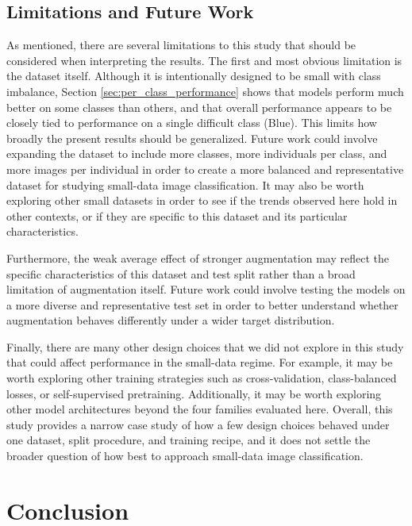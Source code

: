 \documentclass[conference]{IEEEtran}
\begin{document}
\subsection{Limitations and Future Work}

As mentioned, there are several limitations to this study that should be considered when interpreting the results. The first and most obvious limitation is the dataset itself. Although it is intentionally designed to be small with class imbalance, Section \ref{sec:per_class_performance} shows that models perform much better on some classes than others, and that overall performance appears to be closely tied to performance on a single difficult class (Blue). This limits how broadly the present results should be generalized. Future work could involve expanding the dataset to include more classes, more individuals per class, and more images per individual in order to create a more balanced and representative dataset for studying small-data image classification. It may also be worth exploring other small datasets in order to see if the trends observed here hold in other contexts, or if they are specific to this dataset and its particular characteristics.

Furthermore, the weak average effect of stronger augmentation may reflect the specific characteristics of this dataset and test split rather than a broad limitation of augmentation itself. Future work could involve testing the models on a more diverse and representative test set in order to better understand whether augmentation behaves differently under a wider target distribution.

Finally, there are many other design choices that we did not explore in this study that could affect performance in the small-data regime. For example, it may be worth exploring other training strategies such as cross-validation, class-balanced losses, or self-supervised pretraining. Additionally, it may be worth exploring other model architectures beyond the four families evaluated here. Overall, this study provides a narrow case study of how a few design choices behaved under one dataset, split procedure, and training recipe, and it does not settle the broader question of how best to approach small-data image classification.

\section{Conclusion}
\end{document}
